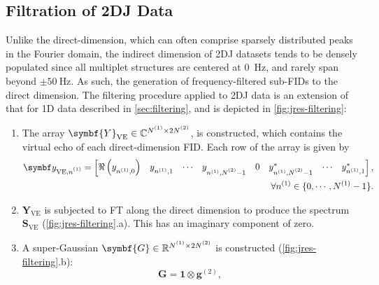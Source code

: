 \subsection{Filtration of \ac{2DJ} Data}
\label{subsec:jres-filtering}
Unlike the direct-dimension, which can often comprise sparsely distributed
peaks in the Fourier domain, the indirect dimension of \ac{2DJ} datasets tends
to be densely populated since all multiplet structures are centered at
\qty{0}{\hertz}, and rarely span beyond $\pm \qty{50}{\hertz}$. As such,
the generation of frequency-filtered sub-\acp{FID} to
the direct dimension.
The filtering procedure applied to \ac{2DJ} data is an extension of that
for \ac{1D} data described in \cref{sec:filtering}, and is
depicted in \cref{fig:jres-filtering}:
\begin{enumerate}
    \item The array $\symbf{Y}_{\text{VE}} \in \mathbb{C}^{\None \times 2
        \Ntwo}$, is constructed, which contains the virtual echo of each
        direct-dimension \ac{FID}. Each row of the array is given by
        \begin{equation}
            \begin{split}
            \by_{\text{VE},\none} =
                \begin{bmatrix}
                    \Re\left(y_{n^{(1)}, 0}^{\vphantom{*}}\right) &
                    y_{n^{(1)}, 1}^{\vphantom{*}} &
                    \cdots &
                    y_{n^{(1)}, \Ntwo - 1}^{\vphantom{*}} &
                    0 &
                    y_{n^{(1)}, \Ntwo - 1}^* &
                    \cdots &
                    y_{n^{(1)}, 1}^*
                \end{bmatrix},\\
                \forall n^{(1)} \in \lbrace 0, \cdots, N^{(1)} - 1 \rbrace.
            \end{split}
        \end{equation}
    \item $\symbf{Y}_{\text{VE}}$ is subjected to \ac{FT} along the direct
        dimension to produce the spectrum  $\symbf{S}_{\text{VE}}$
        (\cref{fig:jres-filtering}.a). This has an imaginary component of
        zero.
    \item A super-Gaussian $\symbf{G} \in \mathbb{R}^{\None \times 2 \Ntwo}$ is
        constructed
        (\cref{fig:jres-filtering}.b):
        \begin{equation}
            \symbf{G} = \symbf{1} \otimes \symbf{g}^{(2)},
        \end{equation}

\end{enumerate}
